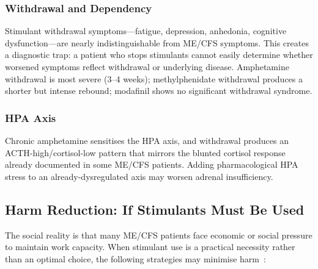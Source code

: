 \subsubsection{Withdrawal and Dependency}

Stimulant withdrawal symptoms---fatigue, depression, anhedonia, cognitive dysfunction---are nearly indistinguishable from ME/CFS symptoms. This creates a diagnostic trap: a patient who stops stimulants cannot easily determine whether worsened symptoms reflect withdrawal or underlying disease. Amphetamine withdrawal is most severe (3--4 weeks); methylphenidate withdrawal produces a shorter but intense rebound; modafinil shows no significant withdrawal syndrome.

\subsubsection{HPA Axis}

Chronic amphetamine sensitises the HPA axis, and withdrawal produces an ACTH-high/cortisol-low pattern that mirrors the blunted cortisol response already documented in some ME/CFS patients. Adding pharmacological HPA stress to an already-dysregulated axis may worsen adrenal insufficiency.

\subsection{Harm Reduction: If Stimulants Must Be Used}
\label{subsec:harm-reduction}

The social reality is that many ME/CFS patients face economic or social pressure to maintain work capacity. When stimulant use is a practical necessity rather than an optimal choice, the following strategies may minimise harm~\cite{ClinicianCoalition2021}:

